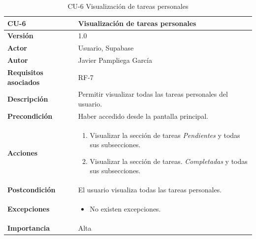 \begin{table}[p]
	\centering
	\begin{tabularx}{\linewidth}{ p{} p{} }
		\toprule
		\textbf{CU-6}    & \textbf{Visualización de tareas personales}\\
		\toprule
		\textbf{Versión}              & 1.0    \\
            \textbf{Actor}                & Usuario, Supabase \\
		\textbf{Autor}                & Javier Pampliega García \\
		\textbf{Requisitos asociados} & RF-7\\
		\textbf{Descripción}          & Permitir visualizar todas las tareas personales del usuario. \\
		\textbf{Precondición}         & Haber accedido desde la pantalla principal. \\
		\textbf{Acciones}             &
		\begin{enumerate}
			\def\labelenumi{\arabic{enumi}.}
			\tightlist
			\item Visualizar la sección de tareas \textit{Pendientes} y todas sus subsecciones.
                \item Visualizar la sección de tareas. \textit{Completadas} y todas sus subsecciones.
		\end{enumerate}\\
		\textbf{Postcondición}        & El usuario visualiza todas las tareas personales. \\
		\textbf{Excepciones}          & \begin{itemize}
		    \item No existen excepciones.
		\end{itemize} \\
		\textbf{Importancia}          & Alta \\
		\bottomrule
	\end{tabularx}
	\caption{CU-6 Visualización de tareas personales}
\end{table}

